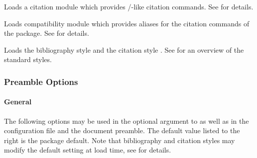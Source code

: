 \documentclass{ltxdockit}[2011/03/25]
\begin{document}
\begin{optionlist}

Loads a citation module which provides \slash{}-like citation commands. See  for details.


Loads compatibility module which provides aliases for the citation commands of the  package. See  for details.


Loads the bibliography style  and the citation style . See  for an overview of the standard styles.

\end{optionlist}

\subsubsection{Preamble Options}
\label{use:opt:pre}

\paragraph{General}
\label{use:opt:pre:gen}

The following options may be used in the optional argument to  as well as in the configuration file and the document preamble. The default value listed to the right is the package default. Note that bibliography and citation styles may modify the default setting at load time, see  for details.
\end{document}
